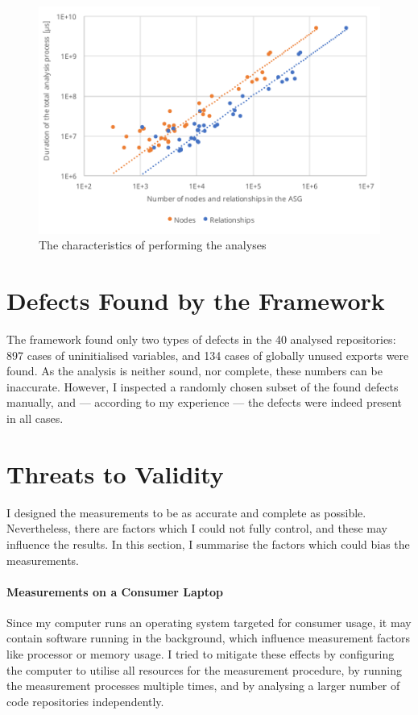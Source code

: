 \begin{figure}[!htb]
	\centerfloat
	\includegraphics[width=\textwidth,clip]{figures/measurement-totaltime-nodes-relationships.pdf}
	\caption{The characteristics of performing the analyses}
	\label{fig:measurement-totaltime-nodes-relationships}
\end{figure}


\section{Defects Found by the Framework}

The framework found only two types of defects in the 40 analysed repositories: 897 cases of uninitialised variables, and 134 cases of globally unused exports were found. As the analysis is neither sound, nor complete, these numbers can be inaccurate. However, I inspected a randomly chosen subset of the found defects manually, and — according to my experience — the defects were indeed present in all cases.


\section{Threats to Validity}

I designed the measurements to be as accurate and complete as possible. Nevertheless, there are factors which I could not fully control, and these may influence the results. In this section, I summarise the factors which could bias the measurements.


\paragraph{Measurements on a Consumer Laptop}
Since my computer runs an operating system targeted for consumer usage, it may contain software running in the background, which influence measurement factors like processor or memory usage. I tried to mitigate these effects by configuring the computer to utilise all resources for the measurement procedure, by running the measurement processes multiple times, and by analysing a larger number of code repositories independently.


